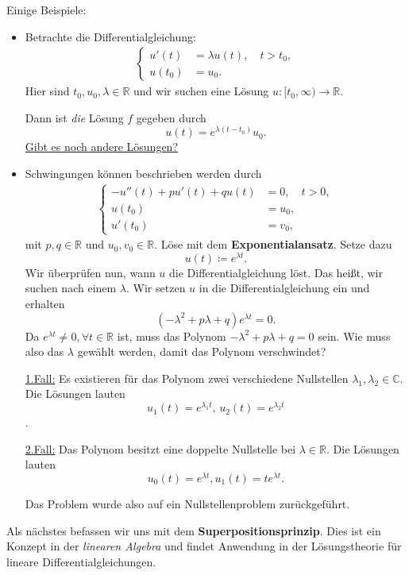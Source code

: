 \documentclass[a4paper]{book}
\theoremstyle{plain}
\theoremstyle{definition}
\newcommand{\R}{\mathbb R}
\newcommand{\vbreak}{\vspace{8mm}}
\begin{document}
Einige Beispiele:
\begin{itemize}
	\item Betrachte die Differentialgleichung:
		\begin{align*}
			\begin{cases}
				u'(t) &= \lambda u(t), \quad t>t_0, \\
				u(t_0) &= u_0.
			\end{cases}
		\end{align*}
		Hier sind $t_0, u_0, \lambda \in \R$ und wir suchen eine Lösung $u:[t_0, \infty) \to \R$.
		
		Dann ist \emph{die} Lösung $f$ gegeben durch
		\[
			u(t) = e^{\lambda(t-t_0)}u_0.
		\]
		\underline{Gibt es noch andere Lösungen?}
		
	\item Schwingungen können beschrieben werden durch
	\begin{align*}
		\begin{cases}
			-u''(t) +pu'(t) +qu(t) &= 0, \quad t>0, \\
								  u(t_0) &= u_0, \\
								 u'(t_0) &= v_0,
		\end{cases}
	\end{align*}
	mit $p,q \in \R$ und $u_0,v_0 \in \R$. Löse mit dem \textbf{Exponentialansatz}. Setze dazu
	\[
		u(t) \coloneqq e^{\lambda t}.
	\]
	Wir überprüfen nun, wann $u$ die Differentialgleichung löst. Das heißt, wir suchen nach einem $\lambda$. Wir setzen $u$ in die Differentialgleichung ein und erhalten
	\[
		(-\lambda^2 +p\lambda +q)e^{\lambda t} = 0.
	\]
	Da $e^{\lambda t} \neq 0, \forall t \in \R$ ist, muss das Polynom $-\lambda^2 +p\lambda +q = 0$ sein. Wie muss also das $\lambda$ gewählt werden, damit das Polynom verschwindet? 
	
	\underline{1.Fall:} Es existieren für das Polynom zwei verschiedene Nullstellen $\lambda_1, \lambda_2 \in \mathbb C$. Die Lösungen lauten $$u_1(t) = e^{\lambda_1t}, \, u_2(t) = e^{\lambda_2t}$$.
	
	\underline{2.Fall:} Das Polynom besitzt eine doppelte Nullstelle bei $\lambda \in \R$. Die Lösungen lauten $$ u_0(t) = e^{\lambda t}, u_1(t) = te^{\lambda t}.$$
	
	Das Problem wurde also auf ein Nullstellenproblem zurückgeführt.
\end{itemize}

\vbreak

Als nächstes befassen wir uns mit dem \textbf{Superpositionsprinzip}. Dies ist ein Konzept in der \emph{linearen Algebra} und findet Anwendung in der Lösungstheorie für lineare Differentialgleichungen. 
\end{document}
